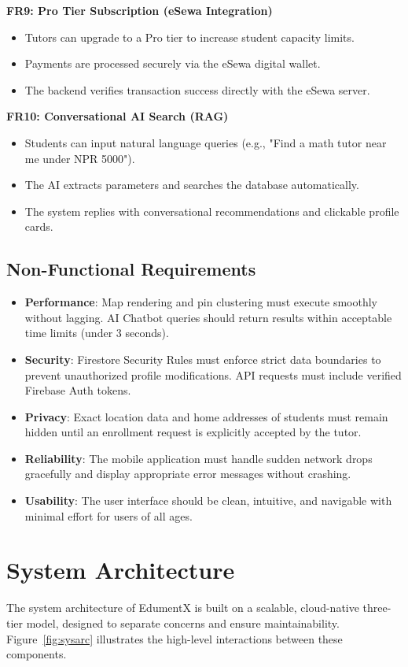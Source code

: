 \documentclass[12pt]{report}
\begin{document}
\smallskip
\noindent \textbf{FR9: Pro Tier Subscription (eSewa Integration)}
\begin{itemize}
\item Tutors can upgrade to a Pro tier to increase student capacity limits.
\item Payments are processed securely via the eSewa digital wallet.
\item The backend verifies transaction success directly with the eSewa server.
\end{itemize}

\smallskip
\noindent \textbf{FR10: Conversational AI Search (RAG)}
\begin{itemize}
\item Students can input natural language queries (e.g., "Find a math tutor near me under NPR 5000").
\item The AI extracts parameters and searches the database automatically.
\item The system replies with conversational recommendations and clickable profile cards.
\end{itemize}

\subsection{Non-Functional Requirements}
\begin{itemize}
\item \textbf{Performance}: Map rendering and pin clustering must execute smoothly without lagging. AI Chatbot queries should return results within acceptable time limits (under 3 seconds).
\item \textbf{Security}: Firestore Security Rules must enforce strict data boundaries to prevent unauthorized profile modifications. API requests must include verified Firebase Auth tokens.
\item \textbf{Privacy}: Exact location data and home addresses of students must remain hidden until an enrollment request is explicitly accepted by the tutor.
\item \textbf{Reliability}: The mobile application must handle sudden network drops gracefully and display appropriate error messages without crashing.
\item \textbf{Usability}: The user interface should be clean, intuitive, and navigable with minimal effort for users of all ages.
\end{itemize}

\section{System Architecture}
The system architecture of EdumentX is built on a scalable, cloud-native three-tier model, designed to separate concerns and ensure maintainability. Figure~\ref{fig:sysarc} illustrates the high-level interactions between these components.
\end{document}

